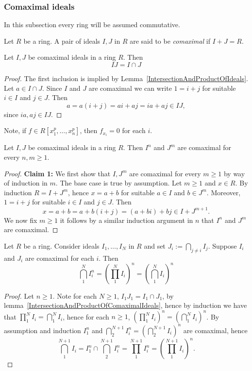 \subsubsection{Comaximal ideals}
In this subsection every ring will be assumed commutative. 
\begin{definition}
    Let $R$ be a ring. A pair of ideals $I,J$ in $R$ are said to be \textit{comaximal} if $I+J = R$.
\end{definition}
\begin{lemma}\label{IntersectionAndProductOfComaximalIdeals}
    Let $I,J$ be comaximal ideals in a ring $R$. Then 
    $$IJ = I \cap J$$
\end{lemma}
\begin{proof}
    The first inclusion is implied by Lemma~\ref{IntersectionAndProductOfIdeals}. Let $a\in I\cap J$. Since $I$ and $J$ are comaximal we can write $1 = i+j$ for suitable $i\in I$ and $j\in J$. Then
    $$a=a(i+j) = ai+aj=ia+aj\in IJ,$$
    since $ia,aj\in IJ$.
\end{proof}
\begin{remark}
    Note, if $f\in R[x_1^p,\dots,x_n^p]$, then $f_{x_i}=0$ for each $i$.
\end{remark}
\begin{lemma}
    Let $I,J$ be comaximal ideals in a ring $R$. Then $I^n$ and $J^m$ are comaximal for every $n,m\geq 1$.
\end{lemma}
\begin{proof}
    \textbf{Claim 1:} We first show that $I,J^m$ are comaximal for every $m\geq 1$ by way of induction in $m$. The base case is true by assumption. Let $m\geq 1$ and $x\in R$. By induction $R= I+J^m$, hence $x=a+b$ for suitable $a\in I$ and $b\in J^m$. Moreover, $1=i+j$ for suitable $i\in I$ and $j\in J$. Then 
    $$x=a+b= a+b(i+j)=(a+bi)+bj\in I+J^{m+1}.$$
    We now fix $m\geq 1$ it follows by a similar induction argument in $n$ that $I^n$ and $J^m$ are comaximal. 
\end{proof}
\begin{lemma}\label{ForComaximalIdealsFiniteIntersectionCommutesWithExponentiation}
    Let $R$ be a ring. Consider ideals $I_1,\dots,I_N$ in $R$ and set $J_i := \bigcap_{j\neq i} I_j$. Suppose $I_i$ and $J_i$ are comaximal for each $i$. Then $$\bigcap_1^N I_i^n=\left(\prod_1^NI_i\right)^n= \left(\bigcap_1^N I_i\right)^n $$
\end{lemma}
\begin{proof}
    Let $n\geq 1$. Note for each $N\geq 1$, $I_1J_1=I_1\cap J_1$, by lemma~\ref{IntersectionAndProductOfComaximalIdeals}, hence by induction we have that $\prod_1^N I_i = \bigcap_1^N I_i$, hence for each $n\geq 1$, $\left(\prod_1^NI_i\right)^n= \left(\bigcap_1^N I_i\right)^n$. By assumption and induction $I_1^{n}$ and $\bigcap_2^{N+1} I_i^n = \left(\bigcap_2^{N+1} I_i\right)^n$ are comaximal, hence 
    $$\bigcap_1^{N+1} I_i = I_1^n\cap \bigcap_2^{N+1} I_i^n= \prod_1^{N+1} I_i^n=\left(\prod_1^{N+1} I_i\right)^n.$$
\end{proof}
